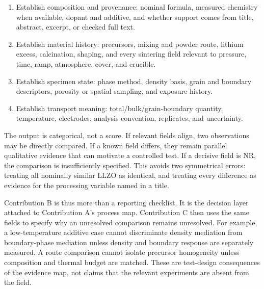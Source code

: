 \begin{enumerate}
\item Establish composition and provenance: nominal formula, measured chemistry when available, dopant and additive, and whether support comes from title, abstract, excerpt, or checked full text.
\item Establish material history: precursors, mixing and powder route, lithium excess, calcination, shaping, and every sintering field relevant to pressure, time, ramp, atmosphere, cover, and crucible.
\item Establish specimen state: phase method, density basis, grain and boundary descriptors, porosity or spatial sampling, and exposure history.
\item Establish transport meaning: total\slash bulk\slash grain-boundary quantity, temperature, electrodes, analysis convention, replicates, and uncertainty.
\end{enumerate}

The output is categorical, not a score. If relevant fields align, two observations may be directly compared. If a known field differs, they remain parallel qualitative evidence that can motivate a controlled test. If a decisive field is NR, the comparison is insufficiently specified. This avoids two symmetrical errors: treating all nominally similar LLZO as identical, and treating every difference as evidence for the processing variable named in a title.

Contribution B is thus more than a reporting checklist. It is the decision layer attached to Contribution A's process map. Contribution C then uses the same fields to specify why an unresolved comparison remains unresolved. For example, a low-temperature additive case cannot discriminate density mediation from boundary-phase mediation unless density and boundary response are separately measured. A route comparison cannot isolate precursor homogeneity unless composition and thermal budget are matched. These are test-design consequences of the evidence map, not claims that the relevant experiments are absent from the field.
